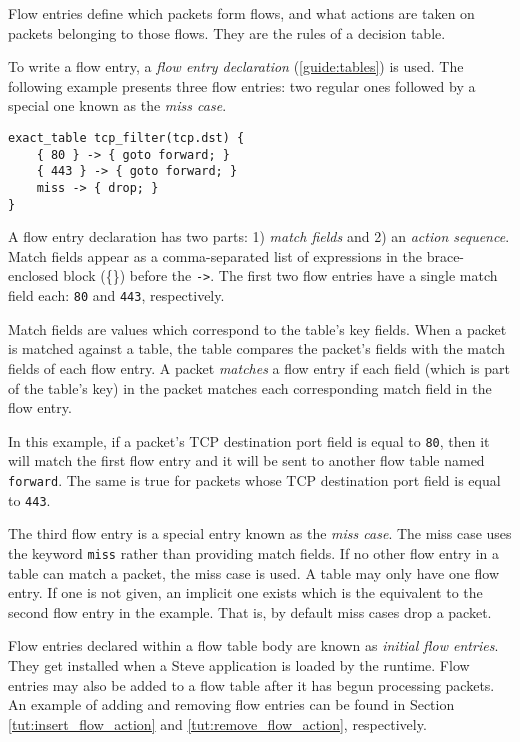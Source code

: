 Flow entries define which packets form flows, and
what actions are taken on packets belonging to those flows.
They are the rules of a decision table.

To write a flow entry, a \textit{flow entry declaration}
(\ref{guide:tables}) is used.
The following example presents three flow entries:
two regular ones followed by a special one known as the \emph{miss case}.

\begin{codepage}
\begin{lstlisting}
exact_table tcp_filter(tcp.dst) {
	{ 80 } -> { goto forward; }
	{ 443 } -> { goto forward; }
	miss -> { drop; }
}
\end{lstlisting}
\end{codepage}

A flow entry declaration has two parts: 1) \textit{match
fields} and 2) an \textit{action sequence}. 
Match fields appear as a comma-separated list of expressions 
in the brace-enclosed block (\{\}) before the \texttt{->}. 
The first two flow entries have a single match field each: 
\texttt{80} and \texttt{443}, respectively.

Match fields are values which correspond to the table's key fields. 
When a packet is matched against a table,
the table compares the packet's fields with the match fields of each flow entry.
A packet \textit{matches} a flow entry if each field (which is part of the
table's key) in the packet matches each corresponding match field in the flow 
entry. 

In this example, if a packet's TCP destination port field is equal to \texttt{80},
then it will match the first flow entry and it will be sent to another flow table
named \texttt{forward}. The same is true for packets whose TCP destination
port field is equal to \texttt{443}.

The third flow entry is a special entry known as the \textit{miss case}. The miss 
case uses the keyword \texttt{miss} rather than providing match fields. If no 
other flow entry in a table can match a packet, the miss case is used. A table 
may only have one flow entry. If one is not given, an implicit one exists which 
is the equivalent to the second flow entry in the example. That is, by default 
miss cases drop a packet.

Flow entries declared within a flow table body are known
as \textit{initial flow entries}. 
They get installed when a Steve application is loaded by the runtime.
Flow entries may also be added to a flow table after it has begun processing packets. 
An example of adding and removing flow entries can be found in Section \ref{tut:insert_flow_action} and \ref{tut:remove_flow_action}, respectively.

